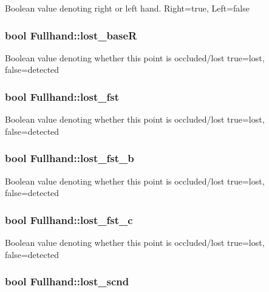 \label{classFullhand_a44fe7f34fc6bfcbd034d16b949ecf8b7}
Boolean value denoting right or left hand. Right=true, Left=false \hypertarget{classFullhand_a45a68f96640bf7207d6c2a58bd3ed834}{
\subsubsection[{lost\_\-baseR}]{\setlength{\rightskip}{0pt plus 5cm}bool {\bf Fullhand::lost\_\-baseR}}}
\label{classFullhand_a45a68f96640bf7207d6c2a58bd3ed834}
Boolean value denoting whether this point is occluded/lost true=lost, false=detected \hypertarget{classFullhand_aadb7136f7ce7e3a4a3ffb1188e7fb744}{
\subsubsection[{lost\_\-fst}]{\setlength{\rightskip}{0pt plus 5cm}bool {\bf Fullhand::lost\_\-fst}}}
\label{classFullhand_aadb7136f7ce7e3a4a3ffb1188e7fb744}
Boolean value denoting whether this point is occluded/lost true=lost, false=detected \hypertarget{classFullhand_aadd18a982717dfd5e7c10495db566752}{
\subsubsection[{lost\_\-fst\_\-b}]{\setlength{\rightskip}{0pt plus 5cm}bool {\bf Fullhand::lost\_\-fst\_\-b}}}
\label{classFullhand_aadd18a982717dfd5e7c10495db566752}
Boolean value denoting whether this point is occluded/lost true=lost, false=detected \hypertarget{classFullhand_a79d6ffa5c5dcd09ab56affa468b72b07}{
\subsubsection[{lost\_\-fst\_\-c}]{\setlength{\rightskip}{0pt plus 5cm}bool {\bf Fullhand::lost\_\-fst\_\-c}}}
\label{classFullhand_a79d6ffa5c5dcd09ab56affa468b72b07}
Boolean value denoting whether this point is occluded/lost true=lost, false=detected \hypertarget{classFullhand_a3f1d564d16316785f7c94ee2c302e59f}{
\subsubsection[{lost\_\-scnd}]{\setlength{\rightskip}{0pt plus 5cm}bool {\bf Fullhand::lost\_\-scnd}}}
